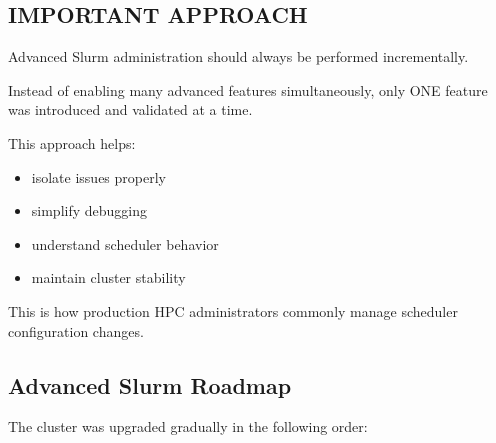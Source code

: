 \documentclass[11pt]{article}
\begin{document}
\subsection{IMPORTANT APPROACH}
\label{sec:org4b1df97}

Advanced Slurm administration should always be performed incrementally.

Instead of enabling many advanced features simultaneously, only ONE
feature was introduced and validated at a time.

This approach helps:

\begin{itemize}
\item isolate issues properly
\item simplify debugging
\item understand scheduler behavior
\item maintain cluster stability
\end{itemize}

This is how production HPC administrators commonly manage scheduler
configuration changes.
\subsection{Advanced Slurm Roadmap}
\label{sec:org947ab70}

The cluster was upgraded gradually in the following order:
\end{document}
